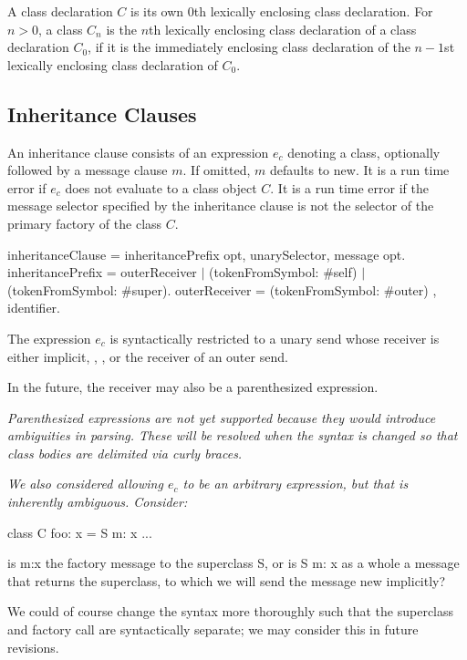 \documentclass{article}
\newcommand{\code}[1]{{\sf #1}}
\begin{document}
A class declaration $C$ is its own 0th lexically enclosing class declaration.  For $n > 0$, a class $C_n$ is the $n$th lexically enclosing class declaration of a class declaration $C_0$, if it is the immediately enclosing class declaration of the $n-1$st lexically enclosing class declaration of $C_0$.


\subsection{Inheritance Clauses}
\label{inheritanceClauses}

 An inheritance clause consists of an expression $e_c$ denoting a class, optionally followed by a message clause $m$.  If omitted, $m$ defaults to \code{new}.  It is a run time error if $e_c$ does not evaluate to a class object $C$.  
It is a run time error if the message selector  specified by the inheritance clause is not the selector of the primary factory of the class $C$.
 
  \begin{newspeak}
inheritanceClause = inheritancePrefix opt, unarySelector, message opt.
inheritancePrefix = outerReceiver $|$  
                              (tokenFromSymbol: \#self) $|$  
                              (tokenFromSymbol: \#super).
outerReceiver = (tokenFromSymbol: \#outer) , identifier.
\end{newspeak}
 
The expression $e_c$ is syntactically restricted to a unary send whose receiver is either implicit, \SELF{}, \SUPER{}, or the receiver of an outer send. %

In the future, the receiver may also be a parenthesized expression.
 
 {\em Parenthesized expressions are not yet supported because they would introduce ambiguities in parsing. These will be resolved when the syntax is changed so that class bodies are delimited via curly braces. }
 
 {\em
We also considered allowing $e_c$ to be an arbitrary expression, but that is inherently ambiguous. Consider:

class C foo: x = S m: x ...

  is m:x the factory message to the superclass S, or is S m: x as a whole a message that returns the superclass, to which we will send the message new implicitly? 
  
 We could of course change the syntax more thoroughly such that the superclass and factory call are syntactically separate; we may consider this in future revisions. 
  }
  
\end{document}
